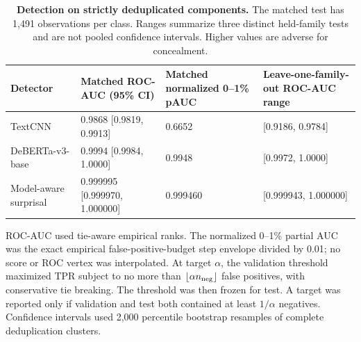 \documentclass[fleqn,10pt]{wlscirep}
\begin{document}
\begin{table}[H]
\centering
\small
\setlength{\tabcolsep}{3pt}
\begin{tabularx}{\textwidth}{L{0.22\textwidth}L{0.20\textwidth}L{0.23\textwidth}Y}
\toprule
Detector & Matched ROC-AUC (95\% CI) & Matched normalized 0--1\% pAUC & Leave-one-family-out ROC-AUC range \\
\midrule
TextCNN & 0.9868 [0.9819, 0.9913] & 0.6652 & [0.9186, 0.9784] \\
DeBERTa-v3-base & 0.9994 [0.9984, 1.0000] & 0.9948 & [0.9972, 1.0000] \\
Model-aware surprisal & 0.999995 [0.999970, 1.000000] & 0.999460 & [0.999943, 1.000000] \\
\bottomrule
\end{tabularx}
\caption{\label{tab:v3-detector-main}\textbf{Detection on strictly deduplicated components.} The matched test has 1,491 observations per class. Ranges summarize three distinct held-family tests and are not pooled confidence intervals. Higher values are adverse for concealment.}
\end{table}

ROC-AUC used tie-aware empirical ranks. The normalized 0--1\% partial AUC was the exact empirical false-positive-budget step envelope divided by 0.01; no score or ROC vertex was interpolated. At target \(\alpha\), the validation threshold maximized TPR subject to no more than \(\lfloor\alpha n_{\rm neg}\rfloor\) false positives, with conservative tie breaking. The threshold was then frozen for test. A target was reported only if validation and test both contained at least \(1/\alpha\) negatives. Confidence intervals used 2,000 percentile bootstrap resamples of complete deduplication clusters.
\end{document}
